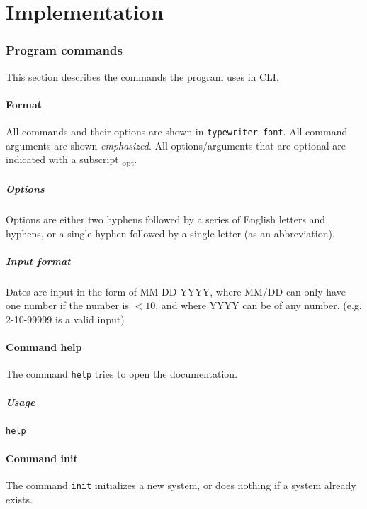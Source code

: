 \part{Implementation}

\section{Program commands}
This section describes the commands the program uses in CLI.

\subsection{Format}
All commands and their options are shown in \texttt{typewriter font}. All command arguments are shown \emph{emphasized}. All options/arguments that are optional are indicated with a subscript \textsubscript{opt}.

\subsubsection{Options}
Options are either two hyphens followed by a series of English letters and hyphens, or a single hyphen followed by a single letter (as an abbreviation).

\subsubsection{Input format} \label{subsubsec:cmd:format:inp.format}
Dates are input in the form of MM-DD-YYYY, where MM/DD can only have one number if the number is $< 10$, and where YYYY can be of any number. (e.g. 2-10-99999 is a valid input)

\subsection{Command help}
The command \texttt{help} tries to open the documentation.

\subsubsection{Usage}
\begin{center}
	\texttt{help}
\end{center}

\subsection{Command init}
The command \texttt{init} initializes a new system, or does nothing if a system already exists.

